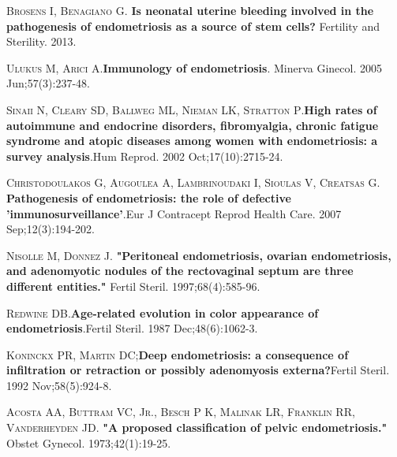 \documentclass[12pt]{article} %
\begin{document}
\vspace{0,5cm}

\textsc{Brosens I, Benagiano G}. \textbf{Is neonatal uterine bleeding involved in the pathogenesis of endometriosis as a source of stem cells?} Fertility and Sterility. 2013.

\vspace{0,5cm}

\textsc{Ulukus M, Arici A}.\textbf{Immunology of endometriosis}. Minerva Ginecol. 2005 Jun;57(3):237-48.

\vspace{0,5cm}

\textsc{Sinaii N, Cleary SD, Ballweg ML, Nieman LK, Stratton P}.\textbf{High rates of autoimmune and endocrine disorders, fibromyalgia, chronic fatigue syndrome and atopic diseases among women with endometriosis: a survey analysis}.Hum Reprod. 2002 Oct;17(10):2715-24.

\vspace{0,5cm}

\textsc{Christodoulakos G, Augoulea A, Lambrinoudaki I, Sioulas V, Creatsas G}. \textbf{Pathogenesis of endometriosis: the role of defective 'immunosurveillance'}.Eur J Contracept Reprod Health Care. 2007 Sep;12(3):194-202.

\vspace{0,5cm}

\textsc{Nisolle M, Donnez J.} \textbf{"Peritoneal endometriosis, ovarian endometriosis, and
adenomyotic nodules of the rectovaginal septum are three different entities."}
Fertil Steril. 1997;68(4):585-96.

\vspace{0,5cm}

\textsc{Redwine DB}.\textbf{Age-related evolution in color appearance of endometriosis}.Fertil Steril. 1987 Dec;48(6):1062-3.

\vspace{0,5cm}

\textsc{Koninckx PR, Martin DC};\textbf{Deep endometriosis: a consequence of infiltration or retraction or possibly adenomyosis externa?}Fertil Steril. 1992 Nov;58(5):924-8.

\vspace{0,5cm}

\textsc{Acosta AA, Buttram VC, Jr., Besch P K, Malinak LR, Franklin RR,
Vanderheyden JD}.\textbf{ "A proposed classification of pelvic endometriosis."}
Obstet Gynecol. 1973;42(1):19-25.

\vspace{0,5cm}
\end{document}
